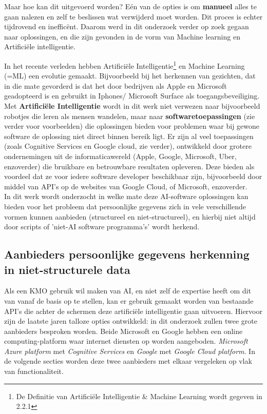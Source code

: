  Maar hoe kan dit uitgevoerd worden? Eén van de opties is om \textbf{manueel} alles te gaan nalezen en zelf te beslissen wat verwijderd moet worden. Dit proces is echter tijdrovend en inefficënt. Daarom werd in dit onderzoek verder op zoek gegaan naar oplossingen, en die zijn gevonden in de vorm van Machine learning en Artificiële intelligentie.


In het recente verleden hebben Artificiële Intelligentie\footnote{De Definitie van Artificiële Intelligentie \& Machine Learning wordt gegeven in 2.2.1} en Machine Learning (=ML) een evolutie gemaakt. Bijvoorbeeld bij het herkennen van gezichten, dat in die mate gevorderd is dat het door bedrijven als Apple en Microsoft geadopteerd is en gebruikt in Iphones/ Microsoft Surface als toegangsbeveiliging.\\
Met \textbf{Artificiële Intelligentie} wordt in dit werk niet verwezen naar bijvoorbeeld robotjes die leren als mensen wandelen, maar naar \textbf{softwaretoepassingen} (zie verder voor voorbeelden) die oplossingen bieden voor problemen waar bij gewone software de oplossing niet direct binnen bereik ligt. 
Er zijn al veel toepassingen (zoals Cognitive Services en Google cloud, zie verder), ontwikkeld door grotere ondernemingen uit de informaticawereld (Apple, Google, Microsoft, Uber, enzoverder) die bruikbare en betrouwbare resultaten opleveren. Deze bieden als voordeel dat ze voor iedere software developer beschikbaar zijn, bijvoorbeeld door middel van API's op de websites van Google Cloud, of Microsoft, enzoverder.\\
 
 In dit werk wordt onderzocht in welke mate deze AI-software oplossingen kan bieden voor het probleem dat persoonlijke gegevens zich in vele verschillende vormen kunnen aanbieden (structureel en niet-structureel), en hierbij niet altijd door scripts of 'niet-AI software programma's' wordt herkend.  

\subsection{Aanbieders persoonlijke gegevens herkenning in niet-structurele data}
Als een KMO gebruik wil maken van AI, en niet zelf de expertise heeft om dit van vanaf de basis op te stellen, kan er gebruik gemaakt worden van bestaande API's die achter de schermen deze artificiële intelligentie gaan uitvoeren. Hiervoor zijn de laatste jaren talloze opties ontwikkeld: in dit onderzoek zullen twee grote aanbieders besproken worden. Beide Microsoft en Google hebben een online computing-platform waar internet diensten op worden aangeboden. \textit{Microsoft Azure platform} met \textit{Cognitive Services} en  \textit{Google} met \textit{Google Cloud platform}. In de volgende secties worden deze twee aanbieders met elkaar vergeleken op vlak van functionaliteit.
 
